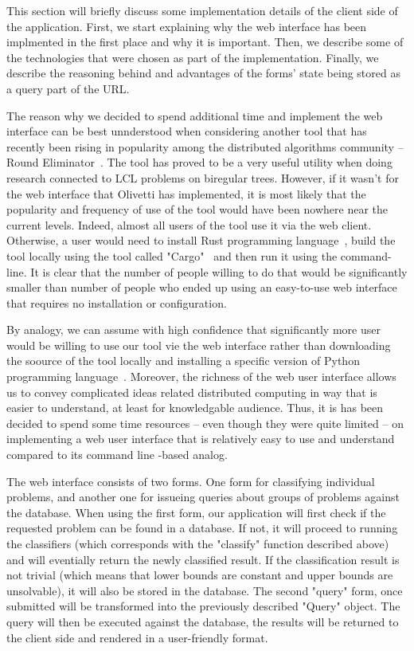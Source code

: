 This section will briefly discuss some implementation details of
the client side of the application. First, we start explaining why
the web interface has been implmented in the first place and why it
is important. Then, we describe some of the technologies that were
chosen as part of the implementation. Finally, we describe the
reasoning behind and advantages of the forms' state being stored
as a query part of the URL.

The reason why we decided to spend additional time and implement
the web interface can be best unnderstood when considering
another tool that has recently been rising in popularity among
the distributed algorithms community -- Round Eliminator~\cite{Olivetti2020}. The tool has proved to be a very useful utility
when doing research connected to LCL problems on biregular trees.
However, if it wasn't for the web interface that Olivetti has
implemented, it is most likely that the popularity and
frequency of use of the tool would have been nowhere near the current
levels. Indeed, almost all users of the tool use it via the web
client. Otherwise, a user would need to install Rust programming
language~\cite{FIXME}, build the tool locally using the tool
called "Cargo"~\cite{FIXME} and then run it using the command-line.
It is clear that the number of people willing to do that would be
significantly smaller than number of people who ended up using
an easy-to-use web interface that requires no installation or 
configuration.

By analogy, we can assume with high confidence that significantly more
user would be willing to use our tool vie the web interface rather
than downloading the soource of the tool locally and installing
a specific version of Python programming language~\cite{FIXME}.
Moreover, the richness of the web user interface allows us to convey complicated
ideas related distributed computing in way that is easier to understand, at least for knowledgable audience. Thus, it is has been
decided to spend some time resources -- even though they were 
quite limited -- on implementing a web user interface that is
relatively easy to use and understand compared to its
command line -based analog.

The web interface consists of two forms. One form for classifying
individual problems, and another one for issueing queries
about groups of problems against the database. When using the
first form, our application will first check if the requested
problem can be found in a database. If not, it will proceed to
running the classifiers (which corresponds with the "classify" function described above) and will eventially return the newly
classified result. If the classification result is not trivial (which means that lower bounds are constant and upper bounds are unsolvable),
it will also be stored in the database. The second "query" form, once
submitted will be transformed into the previously described
"Query" object. The query will then be executed against the database,
the results will be returned to the client side and rendered
in a user-friendly format.

